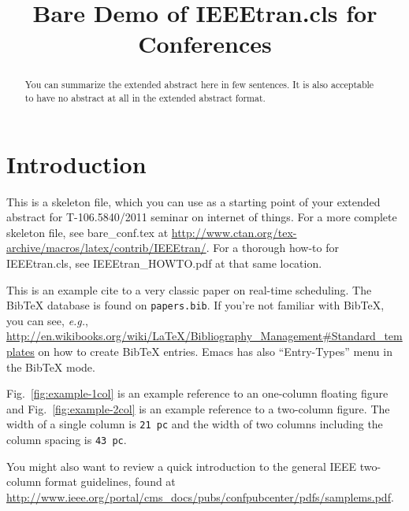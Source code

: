 \documentclass[conference,a4paper]{IEEEtran}
\begin{document}
%
\title{Bare Demo of IEEEtran.cls for Conferences}


\author{
}

\maketitle


\begin{abstract}
You can summarize the extended abstract here in few sentences. It is
also acceptable to have no abstract at all in the extended abstract
format.
\end{abstract}



\section{Introduction}
This is a skeleton file, which you can use as a starting point of your
extended abstract for T-106.5840/2011 seminar on internet of things.
For a more complete skeleton file, see bare\_conf.tex at
\url{http://www.ctan.org/tex-archive/macros/latex/contrib/IEEEtran/}. For
a thorough how-to for IEEEtran.cls, see IEEEtran\_HOWTO.pdf at that
same location.

This is an example cite \cite{liu-layland-1973} to a very classic
paper on real-time scheduling. The BibTeX database is found on
\texttt{papers.bib}. If you're not familiar with BibTeX, you can see,
\emph{e.g.},
\url{http://en.wikibooks.org/wiki/LaTeX/Bibliography_Management#Standard_templates}
on how to create BibTeX entries. Emacs has also ``Entry-Types'' menu
in the BibTeX mode.

Fig.~\ref{fig:example-1col} is an example reference to an 
one-column floating figure and Fig.~\ref{fig:example-2col} is an example
reference to a two-column figure. The width of a
single column is \texttt{21 pc} and the width of two columns including
the column spacing is \texttt{43 pc}.

You might also want to review a quick introduction to the general IEEE
two-column format guidelines, found at
\url{http://www.ieee.org/portal/cms_docs/pubs/confpubcenter/pdfs/samplems.pdf}.
\end{document}
